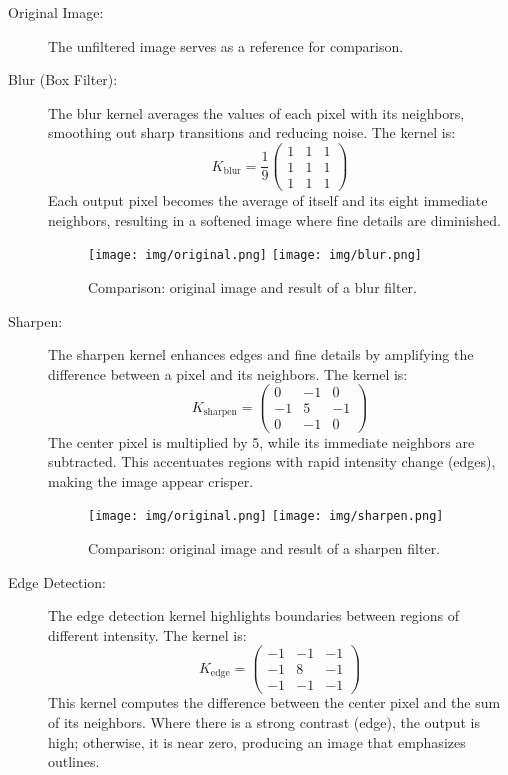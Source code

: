 \documentclass{article}
\begin{document}
\begin{description}
    \item[Original Image:] The unfiltered image serves as a reference for comparison.
    
    \item[Blur (Box Filter):]
    The blur kernel averages the values of each pixel with its neighbors, smoothing out sharp transitions and reducing noise. The kernel is:
    \[
    K_{\text{blur}} = \frac{1}{9} \begin{pmatrix} 1 & 1 & 1 \\ 1 & 1 & 1 \\ 1 & 1 & 1 \end{pmatrix}
    \]
    Each output pixel becomes the average of itself and its eight immediate neighbors, resulting in a softened image where fine details are diminished.
    \begin{figure}[H]
        \centering
        \texttt{[image: img/original.png]}
        \hspace{0.5em}
        \texttt{[image: img/blur.png]}
        \caption{Comparison: original image and result of a blur filter.}
        \label{fig:blur_example}
    \end{figure}
    
    \item[Sharpen:]
    The sharpen kernel enhances edges and fine details by amplifying the difference between a pixel and its neighbors. The kernel is:
    \[
    K_{\text{sharpen}} = \begin{pmatrix} 0 & -1 & 0 \\ -1 & 5 & -1 \\ 0 & -1 & 0 \end{pmatrix}
    \]
    The center pixel is multiplied by 5, while its immediate neighbors are subtracted. This accentuates regions with rapid intensity change (edges), making the image appear crisper.

    \begin{figure}[H]
        \centering
        \texttt{[image: img/original.png]}
        \hspace{0.5em}
        \texttt{[image: img/sharpen.png]}
        \caption{Comparison: original image and result of a sharpen filter.}
        \label{fig:sharpen_example}
    \end{figure}
    
    \item[Edge Detection:]
    The edge detection kernel highlights boundaries between regions of different intensity. The kernel is:
    \[
    K_{\text{edge}} = \begin{pmatrix} -1 & -1 & -1 \\ -1 & 8 & -1 \\ -1 & -1 & -1 \end{pmatrix}
    \]
    This kernel computes the difference between the center pixel and the sum of its neighbors. Where there is a strong contrast (edge), the output is high; otherwise, it is near zero, producing an image that emphasizes outlines.


\end{description}
\end{document}
